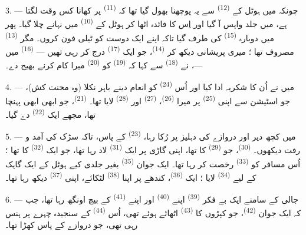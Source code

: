 3. --- چونکہ میں ہوٹل کے  \textsuperscript{(12)} سے یہ
پوچھنا بھول گیا تھا کہ 
\textsuperscript{(11)} پر کھانا کس وقت لگتا ہے، میں جلد واپس آ گیا
اور اِس کا فائدہ اٹھا کر ہوٹل کے 
\textsuperscript{(10)} میں نہانے چلا گیا۔ پھر میں دوبارہ 
\textsuperscript{(15)} کی طرف گیا تاکہ اپنے ایک دوست کو ٹیلی فون کروں۔
مگر  \textsuperscript{(13)} مصروف تھا ؛ میری پریشانی
دیکھ کر  \textsuperscript{(14)}، جو ایک
 \textsuperscript{(17)} درج کر رہی تھیں —  \textsuperscript{(16)} میں —، نے 
\textsuperscript{(18)} سے کہا کہ  \textsuperscript{(19)}
کو  \textsuperscript{(20)} میرا کام کرنے بھیج دے۔

4. --- میں نے اُن کا شکریہ ادا کیا اور اُس 
\textsuperscript{(24)} کو انعام دینے باہر نکلا (وہ محنت کش)، جو
اسٹیشن سے اپنی  \textsuperscript{(25)} پر میرا
 \textsuperscript{(26)}، 
\textsuperscript{(27)} اور 
\textsuperscript{(28)} لایا تھا۔ 
\textsuperscript{(21)}، جو ابھی ابھی پہنچا تھا، مجھے ایک 
\textsuperscript{(22)} دے گیا۔

5. --- میں کچھ دیر اور دروازے کی دہلیز پر رُکا رہا،  \textsuperscript{(23)} کے پاس، تاکہ سڑک کی آمد و رفت دیکھوں۔
 \textsuperscript{(30)}، جو 
\textsuperscript{(29)} کا تھا، اپنی گاڑی پر ایک 
\textsuperscript{(31)} لاد رہا تھا، جو ایک 
\textsuperscript{(32)} کا تھا ؛ اُس مسافر کو 
\textsuperscript{(33)} رخصت کر رہا تھا۔ ایک جوان 
\textsuperscript{(35)} بغیر جلدی کیے ہوٹل کے ایک گاہک کے لیے
 \textsuperscript{(34)} لایا ؛ ایک 
\textsuperscript{(36)}، کندھے پر اپنا 
\textsuperscript{(38)} لٹکائے، اپنی 
\textsuperscript{(37)} دیکھ رہا تھا۔

\VUsaut{4.0mm}
\VUsaut{3.0mm}

6. --- جالی کے سامنے ایک بے فکر  \textsuperscript{(39)}
اپنے  \textsuperscript{(40)} اور اپنے
 \textsuperscript{(41)} کے بیچ اونگھ رہا تھا،
جب کہ ایک جوان  \textsuperscript{(42)}، جو کپڑوں کا
 \textsuperscript{(43)} اٹھائے ہوئے تھی، اُس
 \textsuperscript{(44)} کے سنجیدہ چہرے پر ہنس رہی
تھی، جو دروازے کے پاس کھڑا تھا۔

